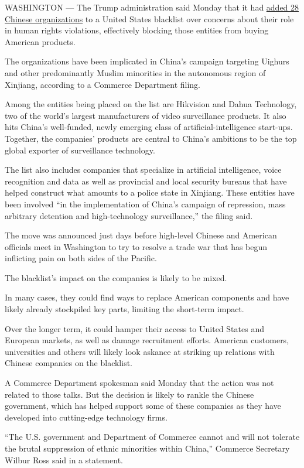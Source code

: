WASHINGTON --- The Trump administration said Monday that it had
\href{https://s3.amazonaws.com/public-inspection.federalregister.gov/2019-22210.pdf}{added
28 Chinese organizations} to a United States blacklist over concerns
about their role in human rights violations, effectively blocking those
entities from buying American products.

The organizations have been implicated in China's campaign targeting
Uighurs and other predominantly Muslim minorities in the autonomous
region of Xinjiang, according to a Commerce Department filing.

Among the entities being placed on the list are Hikvision and Dahua
Technology, two of the world's largest manufacturers of video
surveillance products. It also hits China's well-funded, newly emerging
class of artificial-intelligence start-ups. Together, the companies'
products are central to China's ambitions to be the top global exporter
of surveillance technology.

The list also includes companies that specialize in artificial
intelligence, voice recognition and data as well as provincial and local
security bureaus that have helped construct what amounts to a police
state in Xinjiang. These entities have been involved ``in the
implementation of China's campaign of repression, mass arbitrary
detention and high-technology surveillance,'' the filing said.

The move was announced just days before high-level Chinese and American
officials meet in Washington to try to resolve a trade war that has
begun inflicting pain on both sides of the Pacific.

The blacklist's impact on the companies is likely to be mixed.

In many cases, they could find ways to replace American components and
have likely already stockpiled key parts, limiting the short-term
impact.

Over the longer term, it could hamper their access to United States and
European markets, as well as damage recruitment efforts. American
customers, universities and others will likely look askance at striking
up relations with Chinese companies on the blacklist.

A Commerce Department spokesman said Monday that the action was not
related to those talks. But the decision is likely to rankle the Chinese
government, which has helped support some of these companies as they
have developed into cutting-edge technology firms.

``The U.S. government and Department of Commerce cannot and will not
tolerate the brutal suppression of ethnic minorities within China,''
Commerce Secretary Wilbur Ross said in a statement.

